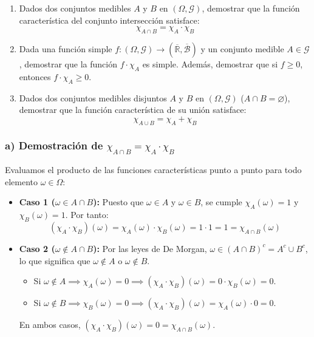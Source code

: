 \begin{problema}
\begin{enumerate}[label=\alph*)]
    \item Dados dos conjuntos medibles $A$ y $B$ en $(\Omega, \mathcal{G})$, demostrar que la función característica del conjunto intersección satisface:
    \[
        \chi_{A \cap B} = \chi_A \cdot \chi_B
    \]
    \item Dada una función simple $f : (\Omega, \mathcal{G}) \to (\overline{\mathbb{R}}, \overline{\mathcal{B}})$ y un conjunto medible $A \in \mathcal{G}$, demostrar que la función $f \cdot \chi_A$ es simple. Además, demostrar que si $f \ge 0$, entonces $f \cdot \chi_A \ge 0$.
    \item Dados dos conjuntos medibles disjuntos $A$ y $B$ en $(\Omega, \mathcal{G})$ ($A \cap B = \varnothing$), demostrar que la función característica de su unión satisface:
    \[
        \chi_{A \cup B} = \chi_A + \chi_B
    \]
\end{enumerate}

\tcblower

\subsubsection*{a) Demostración de $\chi_{A \cap B} = \chi_A \cdot \chi_B$}
Evaluamos el producto de las funciones características punto a punto para todo elemento $\omega \in \Omega$:
\begin{itemize}
    \item \textbf{Caso 1 ($\omega \in A \cap B$):}
    Puesto que $\omega \in A$ y $\omega \in B$, se cumple $\chi_A(\omega) = 1$ y $\chi_B(\omega) = 1$. Por tanto:
    \[
        (\chi_A \cdot \chi_B)(\omega) = \chi_A(\omega) \cdot \chi_B(\omega) = 1 \cdot 1 = 1 = \chi_{A \cap B}(\omega)
    \]
    \item \textbf{Caso 2 ($\omega \notin A \cap B$):}
    Por las leyes de De Morgan, $\omega \in (A \cap B)^c = A^c \cup B^c$, lo que significa que $\omega \notin A$ o $\omega \notin B$.
    \begin{itemize}
        \item Si $\omega \notin A \implies \chi_A(\omega) = 0 \implies (\chi_A \cdot \chi_B)(\omega) = 0 \cdot \chi_B(\omega) = 0$.
        \item Si $\omega \notin B \implies \chi_B(\omega) = 0 \implies (\chi_A \cdot \chi_B)(\omega) = \chi_A(\omega) \cdot 0 = 0$.
    \end{itemize}
    En ambos casos, $(\chi_A \cdot \chi_B)(\omega) = 0 = \chi_{A \cap B}(\omega)$.
\end{itemize}


\end{problema}
